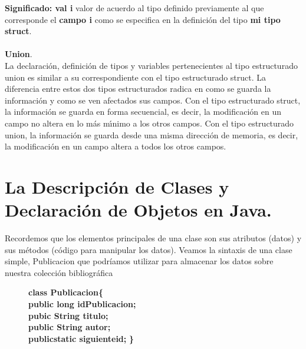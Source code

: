 \documentclass[a4paper]{article}
\begin{document}
\textbf{Significado: val i} valor de acuerdo al tipo definido previamente al que corresponde el \textbf{campo i} como se especifica en la definición del tipo \textbf{mi tipo struct}.\\ 
\\
\textbf{Union}.\\
La declaración, definición de tipos y variables pertenecientes al tipo estructurado union es similar a su correspondiente con el tipo estructurado struct. La diferencia entre estos dos tipos estructurados radica en como se guarda la información y como se ven afectados sus campos. Con el tipo estructurado struct, la información se guarda en forma secuencial, es decir, la modificación en un campo no altera en lo más mı́nimo a los otros campos. Con el tipo estructurado union, la información se guarda desde una misma dirección de memoria, es decir, la modificación en un campo altera a todos los otros campos. 

\section{La Descripción de Clases y Declaración de Objetos en Java.}
Recordemos que los elementos principales de una clase son sus atributos (datos) y sus métodos (código para manipular los datos). Veamos la sintaxis de una clase simple, Publicacion que podríamos utilizar para almacenar los datos sobre nuestra colección bibliográfica

\begin{figure}[H]
	\centering
	\textbf{class Publicacion\{ }\\
	\textbf{public long idPublicacion;} \\ 
	\textbf{pubic String titulo;} \\ 
	\textbf{public String autor;} \\ 
	\textbf{publicstatic siguienteid;} \textbf{\}}
\end{figure}
\end{document}

